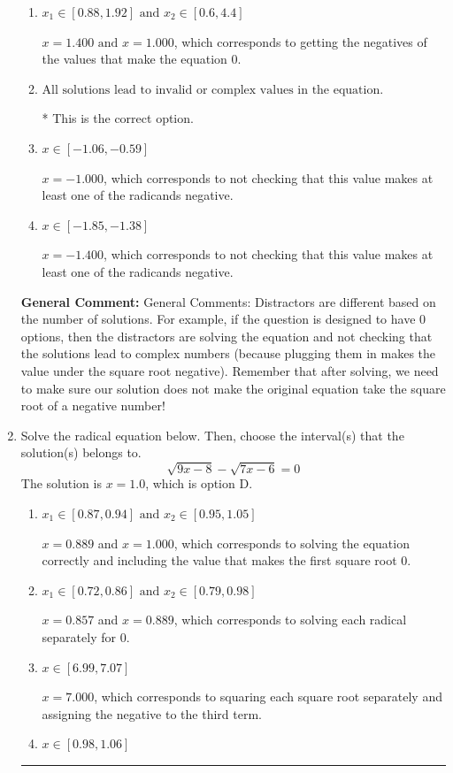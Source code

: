 \documentclass{extbook}[14pt]
\newcommand{\litem}[1]{\item #1

\rule{\textwidth}{0.4pt}}
\begin{document}
\begin{enumerate}
{\begin{enumerate}[label=\Alph*.]
$x = -1.400 \text{ and } x = -1.000$, which corresponds to not checking that BOTH values make at least one of the radicands negative.
\item \( x_1 \in [0.88, 1.92] \text{ and } x_2 \in [0.6,4.4] \)

$x = 1.400 \text{ and } x = 1.000$, which corresponds to getting the negatives of the values that make the equation 0.
\item \( \text{All solutions lead to invalid or complex values in the equation.} \)

* This is the correct option.
\item \( x \in [-1.06,-0.59] \)

$x = -1.000$, which corresponds to not checking that this value makes at least one of the radicands negative.
\item \( x \in [-1.85,-1.38] \)

$x = -1.400$, which corresponds to not checking that this value makes at least one of the radicands negative.
\end{enumerate}

\textbf{General Comment:} General Comments: Distractors are different based on the number of solutions. For example, if the question is designed to have 0 options, then the distractors are solving the equation and not checking that the solutions lead to complex numbers (because plugging them in makes the value under the square root negative). Remember that after solving, we need to make sure our solution does not make the original equation take the square root of a negative number!
}
\litem{
Solve the radical equation below. Then, choose the interval(s) that the solution(s) belongs to.
\[ \sqrt{9 x - 8} - \sqrt{7 x - 6} = 0 \]The solution is \( x = 1.0 \), which is option D.\begin{enumerate}[label=\Alph*.]
\item \( x_1 \in [0.87, 0.94] \text{ and } x_2 \in [0.95,1.05] \)

$x = 0.889$ and $x = 1.000$, which corresponds to solving the equation correctly and including the value that makes the first square root 0.
\item \( x_1 \in [0.72, 0.86] \text{ and } x_2 \in [0.79,0.98] \)

$x = 0.857$ and $x = 0.889$, which corresponds to solving each radical separately for 0.
\item \( x \in [6.99,7.07] \)

$x = 7.000$, which corresponds to squaring each square root separately and assigning the negative to the third term.
\item \( x \in [0.98,1.06] \)


\end{enumerate}}
\end{enumerate}
\end{document}
